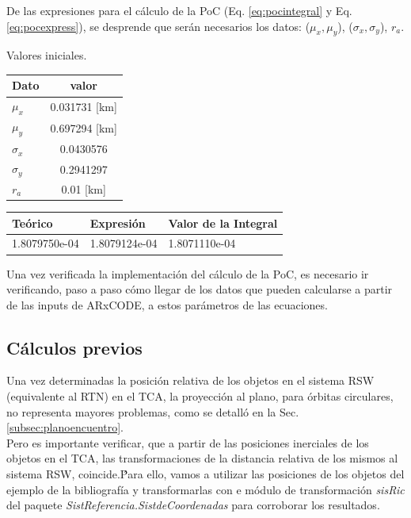 De las expresiones para el c\'alculo de la PoC (Eq. \ref{eq:pocintegral} y Eq. \ref{eq:pocexpress}), se desprende que ser\'an necesarios los datos: ($\mu_{x}, \mu_{y}$), ($\sigma_{x}, \sigma_{y}$), $r_{a}$.

\begin{minipage}[b]{0.28\textwidth}
Valores iniciales.\\

\begin{tabular}{|lc|}
\hline
 Dato & valor \\
\hline
$\mu_{x}$ & 0.031731 [km]\\
$\mu_{y}$ & 0.697294 [km]\\
$\sigma_{x}$ & 0.0430576\\
$\sigma_{y}$ & 0.2941297\\
$r_{a}$ & 0.01 [km]\\
\hline
\end{tabular}
\end{minipage}
\begin{minipage}[t]{0.7\textwidth}
\begin{mdframed}[
        linecolor=red,linewidth=2pt,%
        frametitlerule=true,%
        apptotikzsetting={\tikzset{mdfframetitlebackground/.append style={%
            shade,left color=white, right color=blue!20}}}, 
        frametitlerulecolor=blue,
        frametitlerulewidth=1pt, innertopmargin=\topskip,
        frametitle={Probabilidad de Colisi\'on},
        outerlinewidth=1.25pt
    ]
\large
\begin{tabular}{|l|l|l|}
  \hline
 Te\'orico & Expresi\'on & Valor de la Integral\\
 \hline
 1.8079750e-04 & 1.8079124e-04 & 1.8071110e-04\\
 \hline
\end{tabular} 
\end{mdframed}
\end{minipage}

Una vez verificada la implementaci\'on del c\'alculo de la PoC, es necesario ir verificando, paso a paso c\'omo llegar de los datos que pueden calcularse a partir de las inputs de ARxCODE, a estos par\'ametros de las ecuaciones. \\

\subsection*{C\'alculos previos}

Una vez determinadas la posici\'on relativa de los objetos en el sistema RSW (equivalente al RTN) en el TCA, la proyecci\'on al plano, para \'orbitas circulares, no representa mayores problemas, como se detall\'o en la Sec. \ref{subsec:planoencuentro}.\\
Pero es importante verificar, que a partir de las posiciones inerciales de los objetos en el TCA, las transformaciones de la distancia relativa de los mismos al sistema RSW, coincide.\'
Para ello, vamos a utilizar las posiciones de los objetos del ejemplo de la bibliograf\'ia y transformarlas con e m\'odulo de transformaci\'on {\it{sisRic}} del paquete {\it{SistReferencia.SistdeCoordenadas}} para corroborar los resultados.

